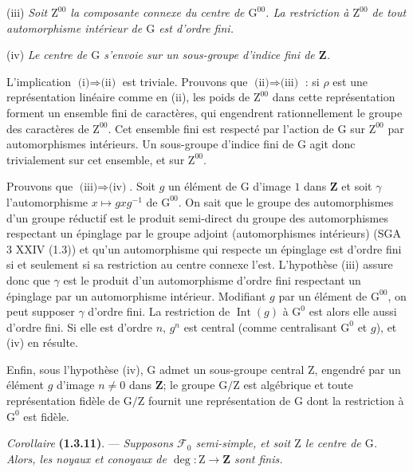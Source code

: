 \documentclass[11pt,leqno]{article}
\begin{document}
(iii) \textit{Soit \(\mathrm{Z}^{00}\) la composante connexe du centre de \(\mathrm{G}^{00}\). La restriction à \(\mathrm{Z}^{00}\) de tout automorphisme intérieur de \(\mathrm{G}\) est d’ordre fini.}

(iv) \textit{Le centre de \(\mathrm{G}\) s’envoie sur un sous-groupe d’indice fini de \(\mathbf{Z}\).}

L’implication \(\text{(i)}\Rightarrow\text{(ii)}\) est triviale. Prouvons que \(\text{(ii)}\Rightarrow\text{(iii)}\) : si \(\rho\) est une représentation linéaire comme en (ii), les poids de \(\mathrm{Z}^{00}\) dans cette représentation forment un ensemble fini de caractères, qui engendrent rationnellement le groupe des caractères de \(\mathrm{Z}^{00}\). Cet ensemble fini est respecté par l’action de \(\mathrm{G}\) sur \(\mathrm{Z}^{00}\) par automorphismes intérieurs. Un sous-groupe d’indice fini de \(\mathrm{G}\) agit donc trivialement sur cet ensemble, et sur \(\mathrm{Z}^{00}\).

Prouvons que \(\text{(iii)}\Rightarrow\text{(iv)}\). Soit \(g\) un élément de \(\mathrm{G}\) d’image \(1\) dans \(\mathbf{Z}\) et soit \(\gamma\) l’automorphisme \(x\mapsto gxg^{-1}\) de \(\mathrm{G}^{00}\). On sait que le groupe des automorphismes d’un groupe réductif est le produit semi-direct du groupe des automorphismes respectant un épinglage par le groupe adjoint (automorphismes intérieurs) (SGA 3 XXIV (1.3)) et qu’un automorphisme qui respecte un épinglage est d’ordre fini si et seulement si sa restriction au centre connexe l’est. L’hypothèse (iii) assure donc que \(\gamma\) est le produit d’un automorphisme d’ordre fini respectant un épinglage par un automorphisme intérieur. Modifiant \(g\) par un élément de \(\mathrm{G}^{00}\), on peut supposer \(\gamma\) d’ordre fini. La restriction de \(\operatorname{Int}(g)\) à \(\mathrm{G}^0\) est alors elle aussi d’ordre fini. Si elle est d’ordre \(n\), \(g^n\) est central (comme centralisant \(\mathrm{G}^0\) et \(g\)), et (iv) en résulte.

Enfin, sous l’hypothèse (iv), \(\mathrm{G}\) admet un sous-groupe central \(\mathrm{Z}\), engendré par un élément \(g\) d’image \(n\ne0\) dans \(\mathbf{Z}\); le groupe \(\mathrm{G}/\mathrm{Z}\) est algébrique et toute représentation fidèle de \(\mathrm{G}/\mathrm{Z}\) fournit une représentation de \(\mathrm{G}\) dont la restriction à \(\mathrm{G}^0\) est fidèle.

\textit{Corollaire} \textbf{(1.3.11)}. — \textit{Supposons \(\mathscr{F}_0\) semi-simple, et soit \(\mathrm{Z}\) le centre de \(\mathrm{G}\). Alors, les noyaux et conoyaux de \(\deg:\mathrm{Z}\to\mathbf{Z}\) sont finis.}
\end{document}
